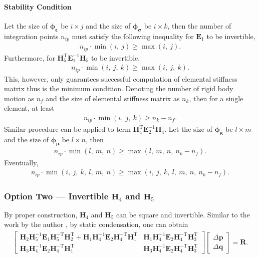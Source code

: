 \documentclass[3p,sort&compress,11pt,fleqn]{elsarticle}
\newcommand*{\mT}{\mathrm{T}}
\begin{document}
\paragraph{Stability Condition}
Let the size of $\mathbold{\phi}_\mathbold{\varepsilon}$ be $i\times{}j$ and the size of $\mathbold{\phi}_\mathbold{\sigma}$ be $i\times{}k$, then the number of integration points $n_{ip}$ must satisfy the following inequality for $\mathbold{E}_1$ to be invertible,
\begin{gather}
n_{ip}\cdot{}\min\left(i,~j\right)\geqslant{}\max\left(i,~j\right).
\end{gather}
Furthermore, for $\mathbold{H}_5^\mT\mathbold{E}_1^{-1}\mathbold{H}_5$ to be invertible,
\begin{gather}
n_{ip}\cdot{}\min\left(i,~j,~k\right)\geqslant{}\max\left(i,~j,~k\right).
\end{gather}
This, however, only guarantees successful computation of elemental stiffness matrix thus is the minimum condition. Denoting the number of rigid body motion as $n_f$ and the size of elemental stiffness matrix as $n_k$, then for a single element, at least
\begin{gather}
n_{ip}\cdot{}\min\left(i,~j,~k\right)\geqslant{}n_k-n_f.
\end{gather}
Similar procedure can be applied to term $\mathbold{H}_4^\mT\mathbold{E}_2^{-1}\mathbold{H}_4$. Let the size of $\mathbold{\phi}_\mathbold{\kappa}$ be $l\times{}m$ and the size of $\mathbold{\phi}_\mathbold{\mu}$ be $l\times{}n$, then
\begin{gather}
n_{ip}\cdot{}\min\left(l,~m,~n\right)\geqslant{}\max\left(l,~m,~n,~n_k-n_f\right).
\end{gather}
Eventually,
\begin{gather}\label{eq:stability}
n_{ip}\cdot{}\min\left(i,~j,~k,~l,~m,~n\right)\geqslant{}\max\left(i,~j,~k,~l,~m,~n,~n_k-n_f\right).
\end{gather}
\subsubsection{Option Two --- Invertible $\mathbold{H}_4$ and $\mathbold{H}_5$}
By proper construction, $\mathbold{H}_4$ and $\mathbold{H}_5$ can be square and invertible. Similar to the work by the author \citep{Chang2019}, by static condensation, one can obtain
\begin{gather}
\begin{bmatrix}
\mathbold{H}_2\mathbold{H}_5^{-1}\mathbold{E}_1\mathbold{H}_5^{-\mT}\mathbold{H}_2^\mT+\mathbold{H}_1\mathbold{H}_4^{-1}\mathbold{E}_2\mathbold{H}_4^{-\mT}\mathbold{H}_1^\mT&\mathbold{H}_1\mathbold{H}_4^{-1}\mathbold{E}_2\mathbold{H}_4^{-\mT}\mathbold{H}_3^\mT\\
\mathbold{H}_3\mathbold{H}_4^{-1}\mathbold{E}_2\mathbold{H}_4^{-\mT}\mathbold{H}_1^\mT&\mathbold{H}_3\mathbold{H}_4^{-1}\mathbold{E}_2\mathbold{H}_4^{-\mT}\mathbold{H}_3^\mT
\end{bmatrix}
\begin{bmatrix}
\Delta\mathbold{p}\\\Delta\mathbold{q}
\end{bmatrix}=\mathbold{R}.
\end{gather}
\end{document}
